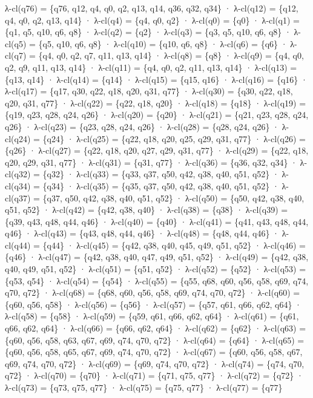 λ-cl(q76) = \{q76, q12, q4, q0, q2, q13, q14, q36, q32, q34\} · λ-cl(q12) = \{q12, q4, q0, q2, q13, q14\} · λ-cl(q4) = \{q4, q0, q2\} · λ-cl(q0) = \{q0\} · λ-cl(q1) = \{q1, q5, q10, q6, q8\} · λ-cl(q2) = \{q2\} · λ-cl(q3) = \{q3, q5, q10, q6, q8\} · λ-cl(q5) = \{q5, q10, q6, q8\} · λ-cl(q10) = \{q10, q6, q8\} · λ-cl(q6) = \{q6\} · λ-cl(q7) = \{q4, q0, q2, q7, q11, q13, q14\} · λ-cl(q8) = \{q8\} · λ-cl(q9) = \{q4, q0, q2, q9, q11, q13, q14\} · λ-cl(q11) = \{q4, q0, q2, q11, q13, q14\} · λ-cl(q13) = \{q13, q14\} · λ-cl(q14) = \{q14\} · λ-cl(q15) = \{q15, q16\} · λ-cl(q16) = \{q16\} · λ-cl(q17) = \{q17, q30, q22, q18, q20, q31, q77\} · λ-cl(q30) = \{q30, q22, q18, q20, q31, q77\} · λ-cl(q22) = \{q22, q18, q20\} · λ-cl(q18) = \{q18\} · λ-cl(q19) = \{q19, q23, q28, q24, q26\} · λ-cl(q20) = \{q20\} · λ-cl(q21) = \{q21, q23, q28, q24, q26\} · λ-cl(q23) = \{q23, q28, q24, q26\} · λ-cl(q28) = \{q28, q24, q26\} · λ-cl(q24) = \{q24\} · λ-cl(q25) = \{q22, q18, q20, q25, q29, q31, q77\} · λ-cl(q26) = \{q26\} · λ-cl(q27) = \{q22, q18, q20, q27, q29, q31, q77\} · λ-cl(q29) = \{q22, q18, q20, q29, q31, q77\} · λ-cl(q31) = \{q31, q77\} · λ-cl(q36) = \{q36, q32, q34\} · λ-cl(q32) = \{q32\} · λ-cl(q33) = \{q33, q37, q50, q42, q38, q40, q51, q52\} · λ-cl(q34) = \{q34\} · λ-cl(q35) = \{q35, q37, q50, q42, q38, q40, q51, q52\} · λ-cl(q37) = \{q37, q50, q42, q38, q40, q51, q52\} · λ-cl(q50) = \{q50, q42, q38, q40, q51, q52\} · λ-cl(q42) = \{q42, q38, q40\} · λ-cl(q38) = \{q38\} · λ-cl(q39) = \{q39, q43, q48, q44, q46\} · λ-cl(q40) = \{q40\} · λ-cl(q41) = \{q41, q43, q48, q44, q46\} · λ-cl(q43) = \{q43, q48, q44, q46\} · λ-cl(q48) = \{q48, q44, q46\} · λ-cl(q44) = \{q44\} · λ-cl(q45) = \{q42, q38, q40, q45, q49, q51, q52\} · λ-cl(q46) = \{q46\} · λ-cl(q47) = \{q42, q38, q40, q47, q49, q51, q52\} · λ-cl(q49) = \{q42, q38, q40, q49, q51, q52\} · λ-cl(q51) = \{q51, q52\} · λ-cl(q52) = \{q52\} · λ-cl(q53) = \{q53, q54\} · λ-cl(q54) = \{q54\} · λ-cl(q55) = \{q55, q68, q60, q56, q58, q69, q74, q70, q72\} · λ-cl(q68) = \{q68, q60, q56, q58, q69, q74, q70, q72\} · λ-cl(q60) = \{q60, q56, q58\} · λ-cl(q56) = \{q56\} · λ-cl(q57) = \{q57, q61, q66, q62, q64\} · λ-cl(q58) = \{q58\} · λ-cl(q59) = \{q59, q61, q66, q62, q64\} · λ-cl(q61) = \{q61, q66, q62, q64\} · λ-cl(q66) = \{q66, q62, q64\} · λ-cl(q62) = \{q62\} · λ-cl(q63) = \{q60, q56, q58, q63, q67, q69, q74, q70, q72\} · λ-cl(q64) = \{q64\} · λ-cl(q65) = \{q60, q56, q58, q65, q67, q69, q74, q70, q72\} · λ-cl(q67) = \{q60, q56, q58, q67, q69, q74, q70, q72\} · λ-cl(q69) = \{q69, q74, q70, q72\} · λ-cl(q74) = \{q74, q70, q72\} · λ-cl(q70) = \{q70\} · λ-cl(q71) = \{q71, q75, q77\} · λ-cl(q72) = \{q72\} · λ-cl(q73) = \{q73, q75, q77\} · λ-cl(q75) = \{q75, q77\} · λ-cl(q77) = \{q77\}

